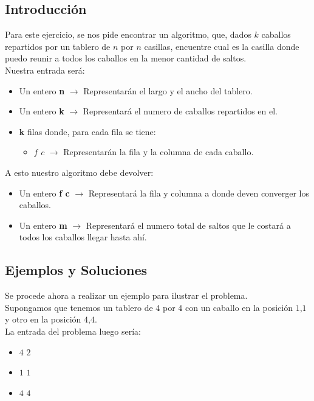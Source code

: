 \subsection{Introducci\'on} 
Para este ejercicio, se nos pide encontrar un algoritmo, que, dados $k$ caballos repartidos por un tablero de $n$ por $n$ casillas, encuentre cual es la casilla donde puedo reunir a todos los caballos en la menor cantidad de saltos.
\\
Nuestra entrada ser\'a:
\\
\begin{itemize}
\item Un entero \textbf{n} $\rightarrow$ Representar\'an el largo y el ancho del tablero.
\item Un entero \textbf{k} $\rightarrow$ Representar\'a el numero de caballos repartidos en el.
\item \textbf{k} filas donde, para cada fila se tiene:
\begin{itemize}
\item $f$ $c$ $\rightarrow$ Representar\'an la fila y la columna de cada caballo.
\end{itemize}
\end{itemize}
A esto nuestro algoritmo debe devolver:
\begin{itemize}
\item Un entero \textbf{f c} $\rightarrow$ Representar\'a la fila y columna a donde deven converger los caballos.
\item Un entero \textbf{m} $\rightarrow$ Representar\'a el numero total de saltos que le costar\'a a todos los caballos llegar hasta ah\'i.
\end{itemize}

\subsection{Ejemplos y Soluciones}
Se procede ahora a realizar un ejemplo para ilustrar el problema.
\\
Supongamos que tenemos un tablero de $4$ por $4$ con un caballo en la posici\'on $1$,$1$ y otro en la posici\'on $4$,$4$.
\\
La entrada del problema luego ser\'ia:
\\
\begin{itemize}
\item $4$ $2$ 
\item $1$ $1$
\item $4$ $4$
\end{itemize}

